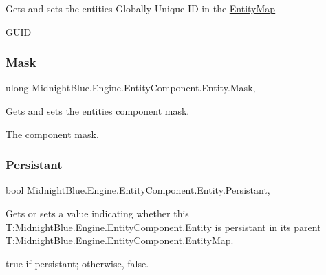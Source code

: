 Gets and sets the entities Globally Unique ID in the \hyperlink{class_midnight_blue_1_1_engine_1_1_entity_component_1_1_entity_map}{Entity\+Map} 

G\+U\+ID\hypertarget{class_midnight_blue_1_1_engine_1_1_entity_component_1_1_entity_a1438182478b8e4e0f9ef1ffebc795c10}{}\label{class_midnight_blue_1_1_engine_1_1_entity_component_1_1_entity_a1438182478b8e4e0f9ef1ffebc795c10} 
\subsubsection{\texorpdfstring{Mask}{Mask}}
{\footnotesize\ttfamily ulong Midnight\+Blue.\+Engine.\+Entity\+Component.\+Entity.\+Mask\hspace{0.3cm}{\ttfamily [get]}, {\ttfamily [set]}}



Gets and sets the entities component mask. 

The component mask.\hypertarget{class_midnight_blue_1_1_engine_1_1_entity_component_1_1_entity_af8d42e94328876a35a63032ed12a54c3}{}\label{class_midnight_blue_1_1_engine_1_1_entity_component_1_1_entity_af8d42e94328876a35a63032ed12a54c3} 
\subsubsection{\texorpdfstring{Persistant}{Persistant}}
{\footnotesize\ttfamily bool Midnight\+Blue.\+Engine.\+Entity\+Component.\+Entity.\+Persistant\hspace{0.3cm}{\ttfamily [get]}, {\ttfamily [set]}}



Gets or sets a value indicating whether this T\+:\+Midnight\+Blue.\+Engine.\+Entity\+Component.\+Entity is persistant in its parent T\+:\+Midnight\+Blue.\+Engine.\+Entity\+Component.\+Entity\+Map. 

{\ttfamily true} if persistant; otherwise, {\ttfamily false}.\hypertarget{class_midnight_blue_1_1_engine_1_1_entity_component_1_1_entity_a4743d696644b924c6f74657daf2de89c}{}\label{class_midnight_blue_1_1_engine_1_1_entity_component_1_1_entity_a4743d696644b924c6f74657daf2de89c} 
